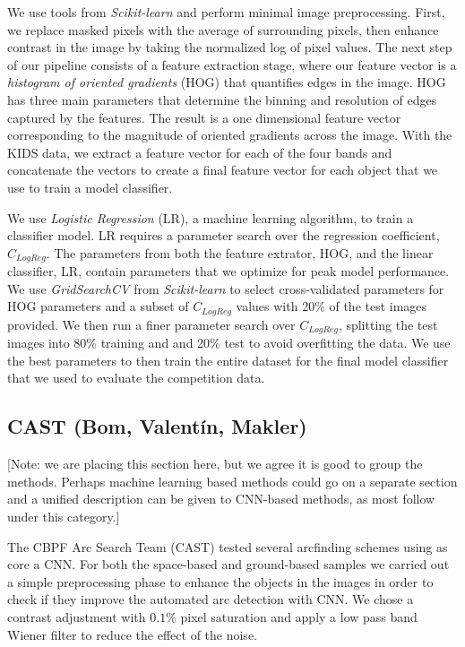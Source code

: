 \documentclass[useAMS,usenatbib]{mnras}
\begin{document}
We use tools from {\em Scikit-learn} \citep{pedregosa_etal12} and
perform minimal image preprocessing. First, we replace masked pixels
with the average of surrounding pixels, then enhance contrast in the
image by taking the normalized log of pixel values.  The next step of
our pipeline consists of a feature extraction stage, where our feature
vector is a {\em histogram of oriented gradients} (HOG)
\citep{dalalandtriggs_05} that quantifies edges in the image.  HOG has
three main parameters that determine the binning and resolution of
edges captured by the features.  The result is a one dimensional
feature vector corresponding to the magnitude of oriented gradients
across the image.  With the KIDS data, we extract a feature vector for
each of the four bands and concatenate the vectors to create a final
feature vector for each object that we use to train a model
classifier.

We use {\em Logistic Regression} (LR), a machine learning algorithm,
to train a classifier model.  LR requires a parameter search over the
regression coefficient, $C_{LogReg}$.  The parameters from both the
feature extrator, HOG, and the linear classifier, LR, contain
parameters that we optimize for peak model performance.  We use {\em
  GridSearchCV} from {\em Scikit-learn} to select cross-validated
parameters for HOG parameters and a subset of $C_{LogReg}$ values with
20\% of the test images provided.  We then run a finer parameter
search over $C_{LogReg}$, splitting the test images into 80\% training
and and 20\% test to avoid overfitting the data.  We use the best
parameters to then train the entire dataset for the final model
classifier that we used to evaluate the competition data.

\subsection{CAST (Bom, Valent\'in, Makler)}
[Note: we are placing this section here, but we agree it is good to group the methods. Perhaps machine learning based methods could go on a separate section and a unified description can be given to CNN-based methods, as most follow under this category.]

The CBPF Arc Search Team (CAST) tested several arcfinding schemes using as core a CNN. For both the space-based and ground-based samples we carried out a simple preprocessing phase to enhance the objects in the images in order to check if they improve the automated arc detection with CNN. We chose a contrast adjustment with $0.1\%$ pixel saturation and apply a low pass band Wiener filter \citep{wiener1964extrapolation} to reduce the effect of the noise. 
\end{document}
